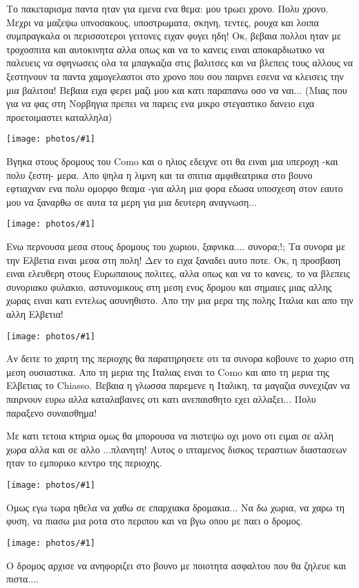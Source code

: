 \documentclass[]{book}
\newcommand\photo[1]{\noindent\texttt{[image: photos/\#1]}}
\begin{document}
Το πακεταρισμα παντα ηταν για εμενα ενα θεμα: μου τρωει χρονο. Πολυ χρονο. Μεχρι να μαζεψω υπνοσακους, υποστρωματα, σκηνη, τεντες, ρουχα και λοιπα συμπραγκαλα οι περισσοτεροι γειτονες ειχαν φυγει ηδη! Οκ, βεβαια πολλοι ηταν με τροχοσπιτα και αυτοκινητα αλλα οπως και να το κανεις ειναι αποκαρδιωτικο να παλευεις να σφηνωσεις ολα τα μπαγκαζια στις βαλιτσες και να βλεπεις τους αλλους να ξεστηνουν τα παντα χαμογελαστοι στο χρονο που σου παιρνει εσενα να κλεισεις την μια βαλιτσα! 
Βεβαια ειχα φερει μαζι μου και κατι παραπανω οσο να ναι... (Μιας που για να φας στη Νορβηγια πρεπει να παρεις ενα μικρο στεγαστικο δανειο ειχα προετοιμαστει καταλληλα)

\photo{22.jpg}

Βγηκα στους δρομους του Como και ο ηλιος εδειχνε οτι θα ειναι μια υπεροχη -και πολυ ζεστη- μερα. 
Απο ψηλα η λιμνη και τα σπιτια αμφιθεατρικα στο βουνο εφτιαχναν ενα πολυ ομορφο θεαμα -για αλλη μια φορα εδωσα υποσχεση στον εαυτο μου να ξαναρθω σε αυτα τα μερη για μια δευτερη αναγνωση...

\photo{23.jpg}

Ενω περνουσα μεσα στους δρομους του χωριου, ξαφνικα.... συνορα;!; Τα συνορα με την Ελβετια ειναι μεσα στη πολη! 
Δεν το ειχα ξαναδει αυτο ποτε. Οκ, η προσβαση ειναι ελευθερη στους Ευρωπαιους πολιτες, αλλα οπως και να το κανεις, το να βλεπεις συνοριακο φυλακιο, αστυνομικους στη μεση ενος δρομου και σημαιες μιας αλλης χωρας ειναι κατι εντελως ασυνηθιστο. 
Απο την μια μερα της πολης Ιταλια και απο την αλλη Ελβετια!

\photo{24.jpg}

Αν δειτε το χαρτη της περιοχης θα παρατηρησετε οτι τα συνορα κοβουνε το χωριο στη μεση ουσιαστικα. Απο τη μερια της Ιταλιας ειναι το Como και απο τη μερια της Ελβετιας το Chiasso. Βεβαια η γλωσσα παρεμενε η Ιταλικη, τα μαγαζια συνεχιζαν να παιρνουν ευρω αλλα καταλαβαινες οτι κατι ανεπαισθητο εχει αλλαξει... Πολυ παραξενο συναισθημα! 

Με κατι τετοια κτηρια ομως θα μπορουσα να πιστεψω οχι μονο οτι ειμαι σε αλλη χωρα αλλα και σε αλλο ...πλανητη! Αυτος ο ιπταμενος δισκος τεραστιων διαστασεων ηταν το εμπορικο κεντρο της περιοχης.

\photo{25.jpg}

Ομως εγω τωρα ηθελα να χαθω σε επαρχιακα δρομακια... 
Να δω χωρια, να χαρω τη φυση, να πιασω μια ροτα στο περιπου και να βγω οπου με παει ο δρομος.

\photo{26.jpg}

Ο δρομος αρχισε να ανηφοριζει στο βουνο με ποιοτητα ασφαλτου που θα ζηλευε και πιστα....
\end{document}
